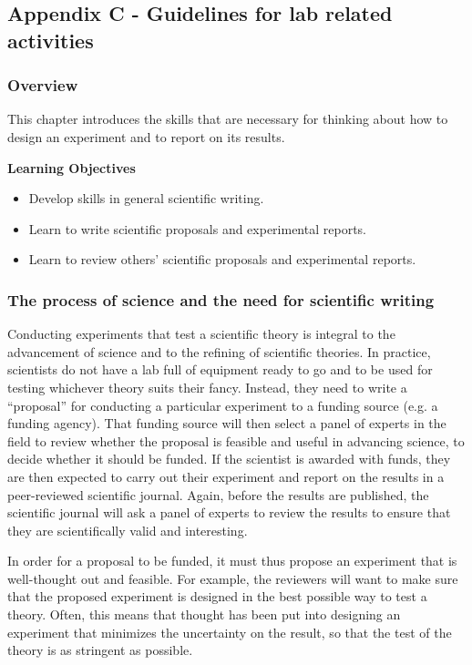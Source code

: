 \subsection{Appendix C - Guidelines for lab related activities}

\subsubsection{Overview}\label{app:labs}

This chapter introduces the skills that are necessary for thinking about how to design an experiment and to report on its results.

\begin{framed}
\textbf{Learning Objectives}\\
\begin{itemize}
\item Develop skills in general scientific writing.
\item Learn to write scientific proposals and experimental reports.
\item Learn to review others' scientific proposals and experimental reports.
\end{itemize}
\end{framed}

\subsubsection{The process of science and the need for scientific writing}

Conducting experiments that test a scientific theory is integral to the advancement of science and to the refining of scientific theories. In practice, scientists do not have a lab full of equipment ready to go and to be used for testing whichever theory suits their fancy. Instead, they need to write a ``proposal'' for conducting a particular experiment to a funding source (e.g. a funding agency). That funding source will then select a panel of experts in the field to review whether the proposal is feasible and useful in advancing science, to decide whether it should be funded. If the scientist is awarded with funds, they are then expected to carry out their experiment and report on the results in a peer-reviewed scientific journal. Again, before the results are published, the scientific journal will ask a panel of experts to review the results to ensure that they are scientifically valid and interesting.

In order for a proposal to be funded, it must thus propose an experiment that is well-thought out and feasible. For example, the reviewers will want to make sure that the proposed experiment is designed in the best possible way to test a theory. Often, this means that thought has been put into designing an experiment that minimizes the uncertainty on the result, so that the test of the theory is as stringent as possible.

